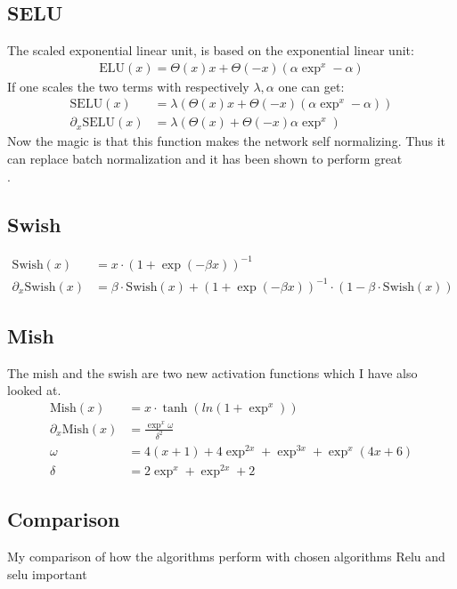 \subsection{SELU}
The scaled exponential linear unit, is based on the exponential linear unit:
\begin{align}
	\text{ELU}(x) = \Theta(x)  x + \Theta(-x) (\alpha \exp^x - \alpha) 
\end{align}
If one scales the two terms with respectively $\lambda, \alpha$ one can get:
\begin{align}
	\text{SELU}(x) &= \lambda (\Theta(x)  x + \Theta(-x) (\alpha \exp^x - \alpha) ) \\
	\partial_x \text{SELU}(x) &= \lambda (\Theta(x) + \Theta(-x) \alpha \exp^x )
\end{align}
Now the magic is that this function makes the network self normalizing. Thus it can replace batch normalization and it has been shown to perform great\cite{zhangEffectivenessScaledExponentiallyRegularized2018}
\cite{madasuEffectivenessSelfNormalizing2019}\\
. 
\subsection{Swish}
\begin{align}
\text{Swish}(x) &= x \cdot (1+\exp(-\beta x))^{-1} \\
\partial_x \text{Swish}(x) &= \beta \cdot \text{Swish}(x) + (1+\exp(-\beta x))^{-1} \cdot (1-\beta \cdot \text{Swish}(x))
\end{align}
\subsection{Mish}
The mish and the swish are two new activation functions which I have also looked at.
\begin{align}
\text{Mish}(x) &= x \cdot \tanh(ln(1+\exp^x)) \\
\partial_x \text{Mish}(x) &= \frac{\exp^x \omega}{\delta^2}\\
\omega &= 4(x+1) + 4 \exp^{2x} + \exp^{3x} + \exp^{x}(4x+6) \\
	\delta &= 2\exp^{x} + \exp^{2x} + 2
\end{align}

\subsection{Comparison}
My comparison of how the algorithms perform with chosen algorithms
Relu and selu important
\cite{nairRectifiedLinearUnits}
\cite{klambauerSelfNormalizingNeuralNetworks2017}
\cite{zhangEffectivenessScaledExponentiallyRegularized2018}
\cite{madasuEffectivenessSelfNormalizing2019}
\newpage
